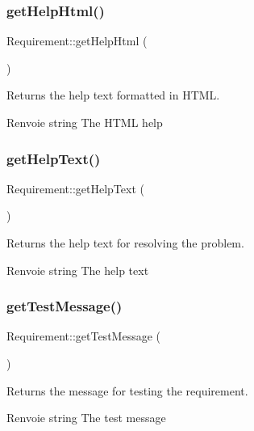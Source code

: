 \subsubsection{\texorpdfstring{get\+Help\+Html()}{getHelpHtml()}}
{\footnotesize\ttfamily Requirement\+::get\+Help\+Html (\begin{DoxyParamCaption}{ }\end{DoxyParamCaption})}

Returns the help text formatted in H\+T\+ML.

\begin{DoxyReturn}{Renvoie}
string The H\+T\+ML help 
\end{DoxyReturn}
\mbox{\label{classRequirement_a6de91d308edfd46aada84b2faa16db01}} 
\subsubsection{\texorpdfstring{get\+Help\+Text()}{getHelpText()}}
{\footnotesize\ttfamily Requirement\+::get\+Help\+Text (\begin{DoxyParamCaption}{ }\end{DoxyParamCaption})}

Returns the help text for resolving the problem.

\begin{DoxyReturn}{Renvoie}
string The help text 
\end{DoxyReturn}
\mbox{\label{classRequirement_ac4cc7cb836c9e0c11018cef57a0fbc4d}} 
\subsubsection{\texorpdfstring{get\+Test\+Message()}{getTestMessage()}}
{\footnotesize\ttfamily Requirement\+::get\+Test\+Message (\begin{DoxyParamCaption}{ }\end{DoxyParamCaption})}

Returns the message for testing the requirement.

\begin{DoxyReturn}{Renvoie}
string The test message 
\end{DoxyReturn}
\mbox{\label{classRequirement_aba605020ffa080b4d5b7217fc42822f0}} 
